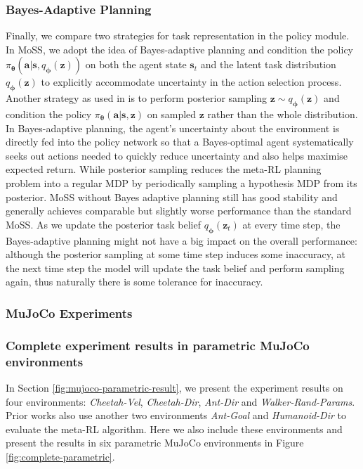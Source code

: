 \documentclass[letterpaper]{article} %
\begin{document}
\subsubsection{Bayes-Adaptive Planning}
Finally, we compare two strategies for task representation in the policy module. In MoSS, we adopt the idea of Bayes-adaptive planning \cite{BAMDP, BayesianRL} and condition the policy $\pi_{\bm \theta}(\bm a|\bm s, q_{\bm \phi}(\bm z))$ on both the agent state $\bm s_{t}$ and the latent task distribution $q_{\bm \phi}(\bm z)$ to explicitly accommodate uncertainty in the action selection process. Another strategy as used in \cite{PEARL} is to perform posterior sampling $\bm z \sim q_{\bm \phi}(\bm z)$ and condition the policy $\pi_{\bm \theta}(\bm a|\bm s, \bm z)$ on sampled $\bm z$ rather than the whole distribution. In Bayes-adaptive planning, the agent’s uncertainty about the environment is directly fed into the policy network so that a Bayes-optimal agent systematically seeks out actions needed to quickly reduce uncertainty and also helps maximise expected return. While posterior sampling reduces the meta-RL planning problem into a regular MDP by periodically sampling a hypothesis MDP from its posterior. 
MoSS without Bayes adaptive planning still has good stability and generally achieves comparable but slightly worse performance than the standard MoSS. As we update the posterior task belief $q_{\bm \phi}(\bm z_{t})$ at every time step, the Bayes-adaptive planning might not have a big impact on the overall performance: although the posterior sampling at some time step induces some inaccuracy, at the next time step the model will update the task belief and perform sampling again, thus naturally there is some tolerance for inaccuracy. 



\subsubsection{MuJoCo Experiments}
\subsubsection{Complete experiment results in parametric MuJoCo environments}
In Section \ref{fig:mujoco-parametric-result}, we present the experiment results on four environments: \textit{Cheetah-Vel}, \textit{Cheetah-Dir}, \textit{Ant-Dir} and \textit{Walker-Rand-Params}. Prior works \cite{PEARL, VariBAD} also use another two environments \textit{Ant-Goal} and \textit{Humanoid-Dir} to evaluate the meta-RL algorithm. Here we also include these environments and present the results in six parametric MuJoCo environments in Figure \ref{fig:complete-parametric}.
\end{document}
